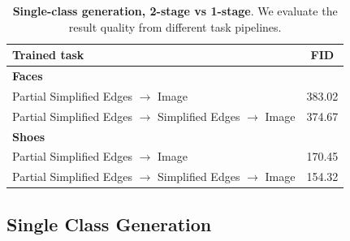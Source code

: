 \begin{table}[t]
\resizebox{1.\linewidth}{!} {
    \centering
        \begin{tabular}{l c}
        \toprule
        \textbf{Trained task} & \textbf{FID} \\ \midrule
        \textbf{Faces}\\ \hline
        Partial Simplified Edges $\rightarrow$ Image & 383.02 \\
        Partial Simplified Edges $\rightarrow$ Simplified Edges $\rightarrow$ Image & 374.67 \\
        \hline
        \textbf{Shoes}\\ \hline
        Partial Simplified Edges $\rightarrow$ Image & 170.45 \\
        Partial Simplified Edges $\rightarrow$ Simplified Edges $\rightarrow$ Image & 154.32 \\
        \bottomrule %
        \end{tabular}
        }
    \vspace{-2mm}
    \caption{\label{table:2step_eval_single_class} \textbf{Single-class generation, 2-stage vs 1-stage}. We evaluate the result quality from different task pipelines.
    \vspace{-4mm}
    }
\end{table}
\vspace{-2mm}
\subsection{Single Class Generation}
